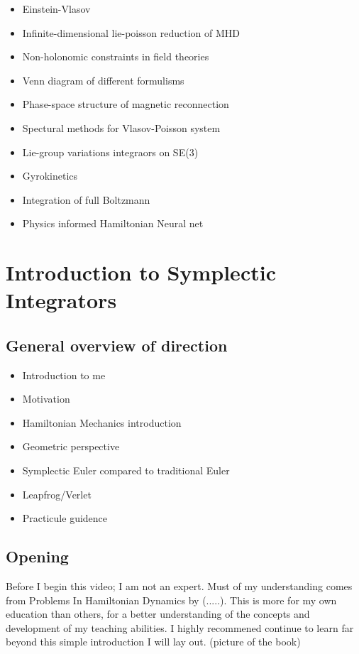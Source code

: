 \begin{itemize}
	\item Einstein-Vlasov
	\item Infinite-dimensional lie-poisson reduction of MHD
	\item Non-holonomic constraints in field theories
  \item Venn diagram of different formulisms
	\item Phase-space structure of magnetic reconnection
	\item Spectural methods for Vlasov-Poisson system
	\item Lie-group variations integraors on SE(3)
	\item Gyrokinetics
  \item Integration of full Boltzmann
  \item Physics informed Hamiltonian Neural net
\end{itemize}


\section{Introduction to Symplectic Integrators}

\subsection{General overview of direction}
\begin{itemize}
	\item Introduction to me
	\item Motivation
	\item Hamiltonian Mechanics introduction
	\item Geometric perspective
	\item Symplectic Euler compared to traditional Euler
	\item Leapfrog/Verlet
	\item Practicule guidence
\end{itemize}

\subsection{Opening}

Before I begin this video; I am not an expert. Must of my understanding comes from Problems In Hamiltonian Dynamics by (.....). This is more for my own education than others, for a better understanding of the concepts and development of my teaching abilities. I highly recommened continue to learn far beyond this simple introduction I will lay out.
(picture of the book)
